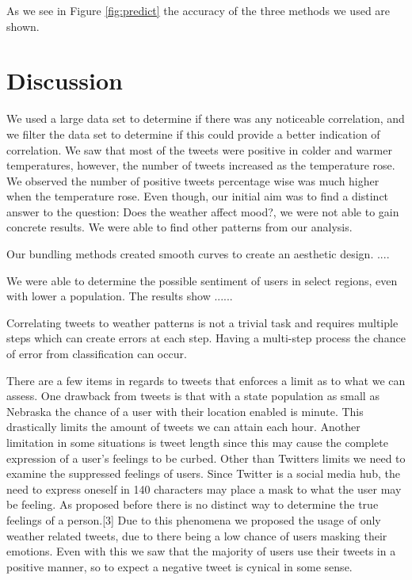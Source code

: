 \documentclass[journal]{vgtc}                %
\begin{document}
As we see in Figure \ref{fig:predict} the accuracy of the three methods we used are shown. 


\newpage

\section{Discussion}
We used a large data set to determine if there was any noticeable correlation, and we filter the data set to determine if this could provide a better indication of correlation. We saw that most of the tweets were positive in colder and warmer temperatures, however, the number of tweets increased as the temperature rose. We observed the number of positive tweets percentage wise was much higher when the temperature rose. Even though, our initial aim was to find a distinct answer to the question: Does the weather affect mood?, we were not able to gain concrete results. We were able to find other patterns from our analysis. 

Our bundling methods created smooth curves to create an aesthetic design. ....

We were able to determine the possible sentiment of users in select regions, even with lower a population. The results show ......

Correlating tweets to weather patterns is not a trivial task and requires multiple steps which can create errors at each step. Having a multi-step process the chance of error from classification can occur. 

There are a few items in regards to tweets that enforces a limit as to what we can assess. One drawback from tweets is that with a state population as small as Nebraska the chance of a user with their location enabled is minute. This drastically limits the amount of tweets we can attain each hour. Another limitation in some situations is tweet length since this may cause the complete expression of a user's feelings to be curbed. Other than Twitters limits we need to examine the suppressed feelings of users. Since Twitter is a social media hub, the need to express oneself in 140 characters may place a mask to what the user may be feeling. As proposed before there is no distinct way to determine the true feelings of a person.[3] Due to this phenomena we proposed the usage of only weather related tweets, due to there being a low chance of users masking their emotions. Even with this we saw that the majority of users use their tweets in a positive manner, so to expect a negative tweet is cynical in some sense.
\end{document}
